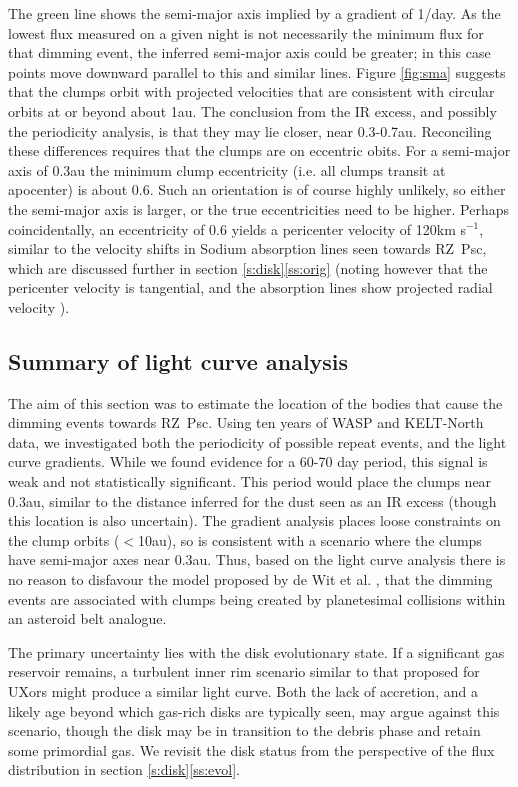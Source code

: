 \documentclass[]{rsos}
\begin{document}
The green line shows the semi-major axis implied by a gradient of 1/day. As the lowest
flux measured on a given night is not necessarily the minimum flux for that dimming
event, the inferred semi-major axis could be greater; in this case points move downward
parallel to this and similar lines. Figure \ref{fig:sma} suggests that the clumps orbit
with projected velocities that are consistent with circular orbits at or beyond about
1au. The conclusion from the IR excess, and possibly the periodicity analysis, is that
they may lie closer, near 0.3-0.7au. Reconciling these differences requires that the
clumps are on eccentric obits. For a semi-major axis of 0.3au the minimum clump
eccentricity (i.e. all clumps transit at apocenter) is about 0.6. Such an orientation is
of course highly unlikely, so either the semi-major axis is larger, or the true
eccentricities need to be higher. Perhaps coincidentally, an eccentricity of 0.6 yields a
pericenter velocity of 120km s$^{-1}$, similar to the velocity shifts in Sodium
absorption lines seen towards RZ~Psc, which are discussed further in section
\ref{s:disk}\ref{ss:orig} (noting however that the pericenter velocity is tangential, and
the absorption lines show projected radial velocity \cite{2013Ap.....56..453P}).

\subsection{Summary of light curve analysis}\label{ss:wheresum}

The aim of this section was to estimate the location of the bodies that cause the dimming
events towards RZ~Psc. Using ten years of WASP and KELT-North data, we investigated both
the periodicity of possible repeat events, and the light curve gradients. While we found
evidence for a 60-70 day period, this signal is weak and not statistically
significant. This period would place the clumps near 0.3au, similar to the distance
inferred for the dust seen as an IR excess (though this location is also uncertain). The
gradient analysis places loose constraints on the clump orbits ($<$10au), so is
consistent with a scenario where the clumps have semi-major axes near 0.3au. Thus, based
on the light curve analysis there is no reason to disfavour the model proposed by de Wit
et al. \cite{2013A&A...553L...1D}, that the dimming events are associated with clumps
being created by planetesimal collisions within an asteroid belt analogue.

The primary uncertainty lies with the disk evolutionary state. If a significant gas
reservoir remains, a turbulent inner rim scenario similar to that proposed for UXors
might produce a similar light curve. Both the lack of accretion, and a likely age beyond
which gas-rich disks are typically seen, may argue against this scenario, though the disk
may be in transition to the debris phase and retain some primordial gas. We revisit the
disk status from the perspective of the flux distribution in section
\ref{s:disk}\ref{ss:evol}.
\end{document}
